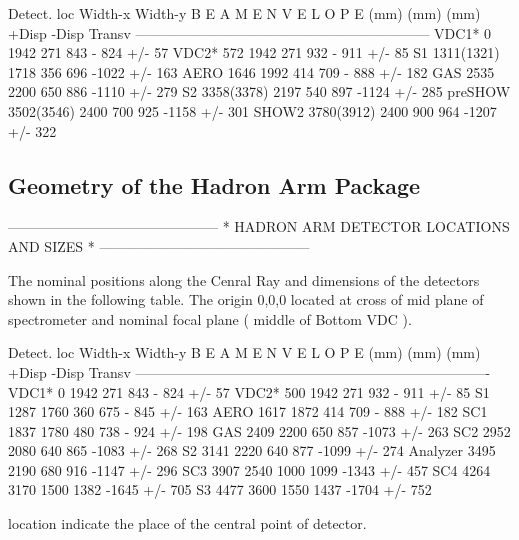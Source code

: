 Detect.     loc     Width-x  Width-y   B E A M  E N V E L O P E 
            (mm)      (mm)     (mm)    +Disp   -Disp   Transv     
---------------------------------------------------------------  
VDC1*        0        1942     271      843    - 824   +/-  57  
VDC2*       572       1942     271      932    - 911   +/-  85 
S1         1311(1321) 1718     356      696    -1022   +/- 163   
AERO       1646       1992     414      709    - 888   +/- 182   
GAS        2535       2200     650      886    -1110   +/- 279   
S2         3358(3378) 2197     540      897    -1124   +/- 285  
preSHOW    3502(3546) 2400     700      925    -1158   +/- 301   
SHOW2      3780(3912) 2400     900      964    -1207   +/- 322   


\subsection{Geometry of the Hadron Arm Package}
              ---------------------------------------------
              *  HADRON ARM DETECTOR LOCATIONS AND SIZES  *
              ---------------------------------------------

The nominal positions along the Cenral Ray and dimensions of the detectors shown in 
the following table. The origin 0,0,0 located at cross of mid plane of spectrometer 
and nominal focal plane ( middle of Bottom VDC ).

Detect.     loc     Width-x  Width-y   B E A M  E N V E L O P E 
            (mm)      (mm)     (mm)    +Disp   -Disp   Transv    
----------------------------------------------------------------------------
VDC1*        0        1942     271      843    - 824   +/-  57  
VDC2*       500       1942     271      932    - 911   +/-  85 
S1         1287       1760     360      675    - 845   +/- 163   
AERO       1617       1872     414      709    - 888   +/- 182  
SC1        1837       1780     480      738    - 924   +/- 198   
GAS        2409       2200     650      857    -1073   +/- 263   
SC2        2952       2080     640      865    -1083   +/- 268   
S2         3141       2220     640      877    -1099   +/- 274   
Analyzer   3495       2190     680      916    -1147   +/- 296   
SC3        3907       2540    1000     1099    -1343   +/- 457  
SC4        4264       3170    1500     1382    -1645   +/- 705   
S3         4477       3600    1550     1437    -1704   +/- 752  

location indicate the place of the central point of detector.










